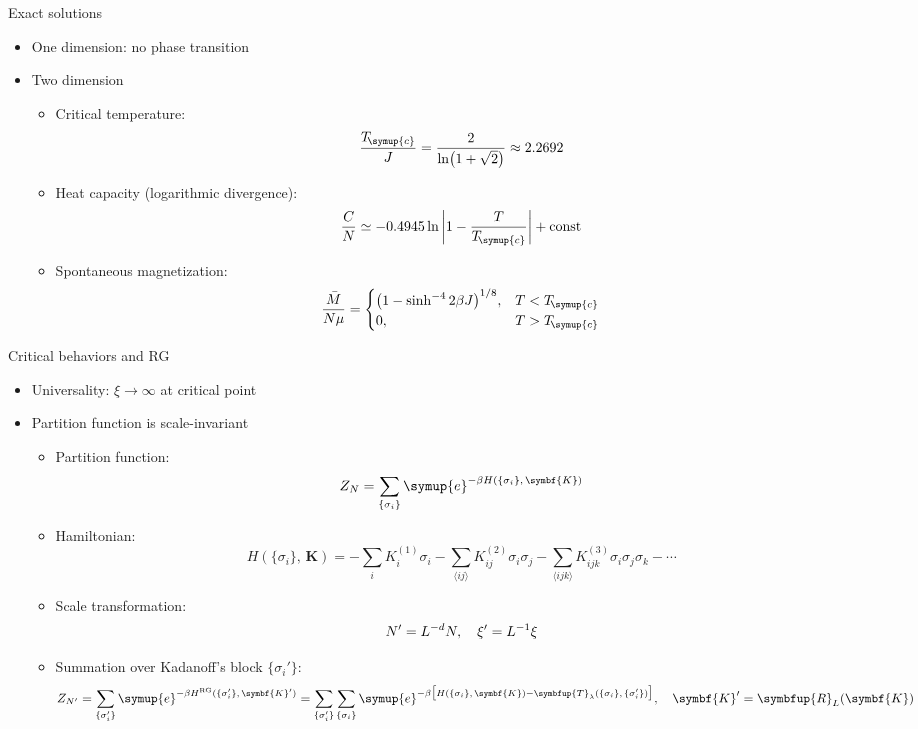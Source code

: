 \documentclass[aspectratio=169]{beamer}
\def\ee{{\symup{e}}}
\def\Tc{T_{\!\symup{c}}}
\def\opT{{\symbfup{T}}}
\newcommand\trR[2][]{\symbfup{R}^{\,#1}_{#2}}
\def\bm#1{{\symbf{#1}}}
\def\nearest#1{\langle#1\rangle}
\def\q#1{{\{#1\}}}
\def\const{\text{const}}
\begin{document}
\begin{frame}{Exact solutions}
\begin{itemize}
  \item One dimension: no phase transition
  \item Two dimension
    \begin{itemize}
      \item Critical temperature:
        \[ \frac{\Tc}{J} = \frac{2}{\ln(1+\sqrt{2})} \approx \num{2.2692} \]
      \item Heat capacity (logarithmic divergence):
        \[ \frac{C}{N} \simeq \num{-0.4945} \ln\abs{1-\frac{T}{\Tc}} + \const \]
      \item Spontaneous magnetization:
        \[
          \frac{\bar{M}}{N\mu} =
          \begin{cases}
            \qty(1 - \sinh^{-4} 2\beta J)^{1/8}, & T<\Tc \\
            0, & T>\Tc
          \end{cases}
        \]
    \end{itemize}
\end{itemize}
\end{frame}

\begin{frame}{Critical behaviors and RG}
\begin{itemize}
  \item Universality: $\xi\to\infty$ at critical point
  \item Partition function is scale-invariant
    \begin{itemize}
      \item Partition function:
        \[ Z_N = \sum_\q{\sigma_i} \ee^{-\beta H(\q{\sigma_i},\,\bm{K})} \]
      \item Hamiltonian:
        \[
            H(\q{\sigma_i},\,\bm{K})
          = - \sum_i K^{(1)}_i \sigma_i
            - \sum_{\nearest{ij}}  K^{(2)}_{ij}  \sigma_i\sigma_j
            - \sum_{\nearest{ijk}} K^{(3)}_{ijk} \sigma_i\sigma_j\sigma_k - \cdots
        \]
      \item Scale transformation:
        \[ N' = L^{-d} N \qc \xi' = L^{-1} \xi \]
      \item Summation over Kadanoff's block $\q{\sigma_i'}$:
        \[
          Z_{N'}
          = \sum_\q{\sigma'_i} \ee^{-\beta H^{\text{RG}}(\q{\sigma_i'},\,\bm{K}')}
          = \sum_\q{\sigma'_i} \sum_\q{\sigma_i}
            \ee^{-\beta \qty\big[H(\q{\sigma_i},\,\bm{K})
                 -\opT_\lambda(\q{\sigma_i},\,\q{\sigma_i'})]} \qc
          \bm{K}' = \trR{L}(\bm{K})
        \]
    \end{itemize}
\end{itemize}
\end{frame}
\end{document}
